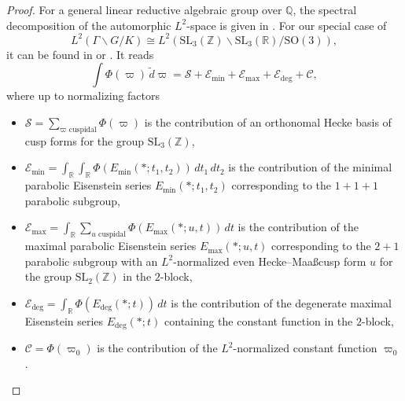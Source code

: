 \documentclass[11pt,oneside]{amsart}
\numberwithin{equation}{section}
\theoremstyle{remark}
\theoremstyle{plain}
\newcommand\SL{\mathrm{SL}}
\newcommand\SO{\mathrm{SO}}
\newcommand\ZZ{\mathbb{Z}}
\newcommand\QQ{\mathbb{Q}}
\newcommand\RR{\mathbb{R}}
\newcommand{\mcE}{\mathcal{E}}
\newcommand\bs{\backslash}
\begin{document}
\begin{proof}
For a general linear reductive algebraic group over $\QQ$, the spectral decomposition of the automorphic $L^2$-space is given in \cite[Main Theorem]{MR546601}. For our special case of
\[L^2(\Gamma\bs G\slash K)\cong L^2(\SL_3(\ZZ)\bs\SL_3(\RR)\slash\SO(3)),\]
it can be found in \cite[\S6]{MR1823867} or \cite[\S10.13]{MR2254662}.
It reads
\begin{equation}\label{explicitspec}
\int \Phi(\varpi) \,\tilde d\varpi = \mathcal{S} + \mcE_{\min} + \mcE_{\max} + \mcE_{\deg} + \mathcal{C},
\end{equation} 
where up to normalizing factors
\begin{itemize}
\item $\displaystyle \mathcal{S} = \sum_{\varpi \text{ cuspidal}} \Phi(\varpi)$ is the contribution of an orthonomal Hecke basis of cusp forms for the group $\SL_3(\ZZ)$,
\item $\displaystyle \mcE_{\min} = \int_{\RR} \int_{\RR} \Phi(E_{\text{min}}(\ast; t_1, t_2)) \, dt_1\, dt_2$ is the contribution of the   minimal parabolic Eisenstein series $E_{\text{min}}(\ast; t_1, t_2)$
corresponding to the $1+1+1$ parabolic subgroup,
\item $\displaystyle \mcE_{\max} = \int_{\RR}\sum_{u \text{ cuspidal}} \Phi(E_{\text{max}}(\ast;u, t)) \,  dt$ is the contribution of the maximal parabolic Eisenstein series $E_{\text{max}}(\ast; u, t)$ corresponding to the $2+1$ parabolic subgroup with an $L^2$-normalized even Hecke--Maa\ss cusp form $u$ for the group $\SL_2(\ZZ)$ in the $2$-block,
\item $\displaystyle \mcE_{\deg} = \int_{\RR}  \Phi(E_{\deg}(\ast;  t)) \,  dt$  is the contribution of the  degenerate maximal Eisenstein series $E_{\deg}(\ast; t)$ containing the constant function in the $2$-block,
\item $\mathcal{C} = \Phi(\varpi_0)$ is the contribution of the $L^2$-normalized constant function $\varpi_0$. 
\end{itemize}


\end{proof}
\end{document}
